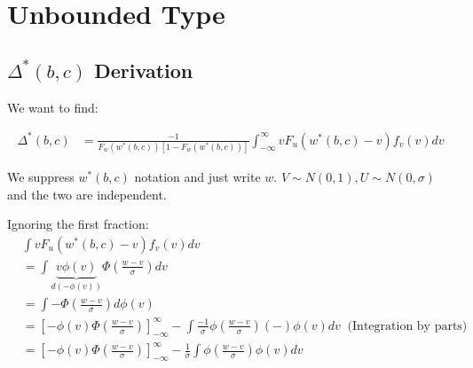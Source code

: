 \documentclass{article}
\begin{document}
\section*{Unbounded Type}

\subsection*{$\Delta^*(b,c)$ Derivation}
We want to find:

\begin{align*}
    \Delta^*(b,c) &= \frac{
        -1
    }{
        F_w(w^*(b,c)) [1 - F_w(w^*(b,c))]
    } \int^\infty_{-\infty} vF_u(w^*(b,c) - v) f_v(v) dv
\end{align*}

We suppress $w^*(b,c)$ notation and just write $w$. $V \sim N(0, 1), U \sim N(0, \sigma)$ 
and the two are independent.


Ignoring the first fraction:
\begin{align*}
    &\int vF_u(w^*(b,c) - v) f_v(v) dv \\
    &= 
    \int \underbrace{v \phi(v)}_{d(-\phi(v))} \Phi\left(\frac{w-v}{\sigma}\right) dv \\
    &= \int - \Phi\left(\frac{w-v}{\sigma}\right) d \phi(v) \\
    &= \left[
        -\phi(v) \Phi\left(\frac{w-v}{\sigma}\right) 
    \right]^\infty_{-\infty} - \int \frac{-1}{\sigma}\phi\left(\frac{w - v}{\sigma}\right) (-) \phi(v) dv \ \text{ (Integration by parts)} \\ 
    &= \left[
        -\phi(v) \Phi\left(\frac{w-v}{\sigma}\right) 
    \right]^\infty_{-\infty} -\frac{1}{\sigma} \int \phi\left(\frac{w - v}{\sigma}\right) \phi(v) dv 
\end{align*}
\end{document}
